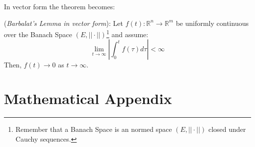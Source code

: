                         In vector form the theorem becomes:
                        \begin{definition}
                            (\textit{Barbalat's Lemma in vector form}): Let $f(t): \mathbb{R}^{n}\rightarrow\mathbb{R}^{m}$ be uniformly continuous over the Banach Space $(E,||\cdot ||)$\footnote{Remember that a Banach Space is an normed space $(E,||\cdot ||)$ closed under Cauchy sequences.} and assume:
                            \begin{equation*}
                                \lim_{t\rightarrow \infty}\left|\int_{0}^{t}{f(\tau)d\tau}\right| <\infty
                            \end{equation*}
                            Then, $f(t)\rightarrow0$ as $t\rightarrow\infty$.
                        \end{definition}
            \newpage
                \section{Mathematical Appendix}
